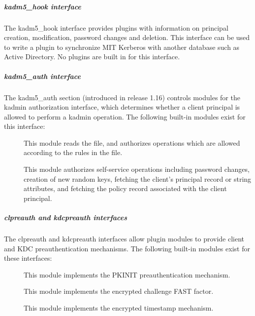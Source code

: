 \documentclass[letterpaper,10pt,english]{sphinxmanual}
\begin{document}
\subparagraph{kadm5\_hook interface}
\label{\detokenize{admin/conf_files/krb5_conf:kadm5-hook-interface}}\label{\detokenize{admin/conf_files/krb5_conf:kadm5-hook}}
The kadm5\_hook interface provides plugins with information on
principal creation, modification, password changes and deletion.  This
interface can be used to write a plugin to synchronize MIT Kerberos
with another database such as Active Directory.  No plugins are built
in for this interface.


\subparagraph{kadm5\_auth interface}
\label{\detokenize{admin/conf_files/krb5_conf:kadm5-auth-interface}}\label{\detokenize{admin/conf_files/krb5_conf:kadm5-auth}}
The kadm5\_auth section (introduced in release 1.16) controls modules
for the kadmin authorization interface, which determines whether a
client principal is allowed to perform a kadmin operation.  The
following built-in modules exist for this interface:
\begin{description}
\item[{}] \leavevmode
This module reads the {\hyperref[\detokenize{admin/conf_files/kadm5_acl:kadm5-acl-5}]{}} file, and authorizes
operations which are allowed according to the rules in the file.

\item[{}] \leavevmode
This module authorizes self-service operations including password
changes, creation of new random keys, fetching the client’s
principal record or string attributes, and fetching the policy
record associated with the client principal.

\end{description}
\label{\detokenize{admin/conf_files/krb5_conf:clpreauth}}

\subparagraph{clpreauth and kdcpreauth interfaces}
\label{\detokenize{admin/conf_files/krb5_conf:clpreauth-and-kdcpreauth-interfaces}}\label{\detokenize{admin/conf_files/krb5_conf:clpreauth}}\label{\detokenize{admin/conf_files/krb5_conf:kdcpreauth}}
The clpreauth and kdcpreauth interfaces allow plugin modules to
provide client and KDC preauthentication mechanisms.  The following
built-in modules exist for these interfaces:
\begin{description}
\item[{}] \leavevmode
This module implements the PKINIT preauthentication mechanism.

\item[{}] \leavevmode
This module implements the encrypted challenge FAST factor.

\item[{}] \leavevmode
This module implements the encrypted timestamp mechanism.

\end{description}
\end{document}
